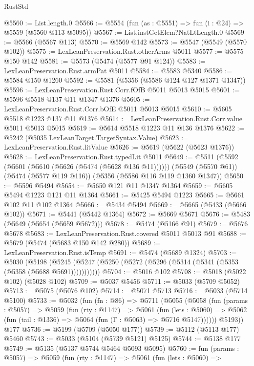 \begin{lexlean}{RustStd}
\begin{coremodule}
{\begin{coremodule}
{{{{{{{{{{{{{{{{{{{{{{{{{{{{{{{{{{@5560 := List.length.{0}
@5566 := @5554 (fun (as : @5551) => fun (i : @24) => @5559 (@5560 @113 @5095))
@5567 := List.instGetElem?NatLtLength.{0}
@5569 := @5566 (@5567 @113)
@5570 := @5569 @142
@5573 := @5547 (@5549 (@5570 @102))
@5575 := LexLeanPreservation.Rust.otherArms @5011
@5577 := @5575 @150 @142
@5581 := @5573 (@5474 (@5577 @91 @124))
@5583 := LexLeanPreservation.Rust.armPat @5011
@5584 := @5583 @5340
@5586 := @5584 @150 @1260
@5592 := @5581 (@5356 (@5586 @124 @127 @1371 @1347))
@5596 := LexLeanPreservation.Rust.Corr.fOfB @5011 @5013 @5015
@5601 := @5596 @5518 @137 @11 @1347 @1376
@5605 := LexLeanPreservation.Rust.Corr.bOfE @5011 @5013 @5015
@5610 := @5605 @5518 @1223 @137 @11 @1376
@5614 := LexLeanPreservation.Rust.Corr.value @5011 @5013 @5015
@5619 := @5614 @5518 @1223 @11 @136 @1376
@5622 := @5242 (@5035 LexLeanTarget.TargetSyntax.Value)
@5623 := LexLeanPreservation.Rust.litValue
@5626 := @5619 (@5622 (@5623 @1376))
@5628 := LexLeanPreservation.Rust.typedLit @5011
@5649 := @5511
    (@5592 (@5601 (@5610 (@5626 (@5474 (@5628 @136 @11))))))
    (@5549 (@5570 @61))
    (@5474 (@5577 @119 @116))
    (@5356 (@5586 @116 @119 @1360 @1347))
@5650 := @5596 @5494
@5654 := @5650 @121 @11 @1347 @1364
@5659 := @5605 @5494 @1223 @121 @11 @1364
@5661 := @5425 @5494 @1223
@5665 := @5661 @102 @11 @102 @1364
@5666 := @5434 @5494
@5669 := @5665 (@5433 (@5666 @102))
@5671 := @5441 (@5442 @1364)
@5672 := @5669 @5671
@5676 := @5483 (@5649 (@5654 (@5659 @5672)))
@5678 := @5474 (@5166 @91)
@5679 := @5676 @5678
@5683 := LexLeanPreservation.Rust.covered @5011 @5013 @91
@5688 := @5679 (@5474 (@5683 @150 @142 @280))
@5689 := LexLeanPreservation.Rust.isTemp
@5691 := @5474 (@5689 @1324)
@5703 := @5030
    (@5198 (@5245 (@5247 (@5250 (@5272 (@5296 (@5314 (@5341 (@5353 (@5358 (@5688 @5691)))))))))))
@5704 := @5016 @102
@5708 := @5018 (@5022 @102) (@5028 @102)
@5709 := @5037 @5456
@5711 := @5033 (@5709 @5052)
@5713 := @5075 (@5076 @102)
@5714 := @5071 @5713
@5716 := @5033 (@5714 @5100)
@5733 := @5032
    (fun (fn : @86) =>
    @5711
      (@5055
        (@5058
          (fun (params : @5057) =>
          @5059
            (fun (rty : @1147) =>
            @5061
              (fun (lets : @5060) =>
              @5062 (fun (tail : @1336) => @5064 (fun (Γ : @5063) => @5716 @5147))))))
        @5193))
    @177
@5736 := @5199 (@5709 (@5050 @177))
@5739 := @5112 (@5113 @177) @5460
@5743 := @5033 (@5104 (@5739 @5121) @5125)
@5744 := @5138 @177
@5749 := @5135 (@5137 @5744 @5464 @5093 @5095)
@5760 := fun (params : @5057) =>
  @5059
    (fun (rty : @1147) =>
    @5061
      (fun (lets : @5060) =>
}}}}}}}}}}}}}}}}}}}}}}}}}}}}}}}}}}
\end{coremodule}}
\end{coremodule}
\end{lexlean}
